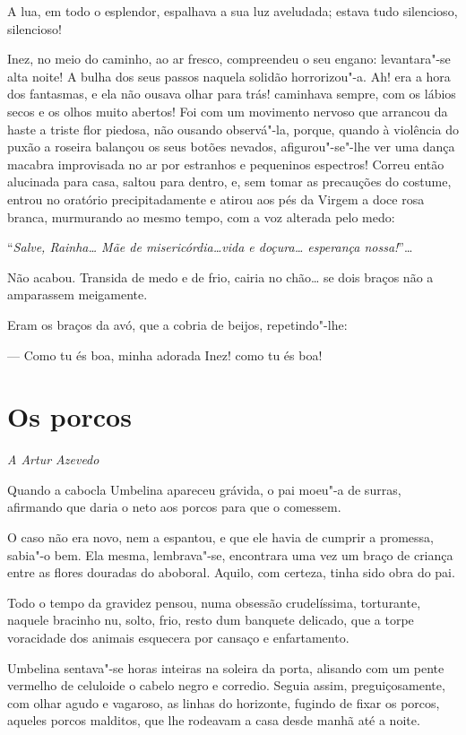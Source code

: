 A lua, em todo o esplendor, espalhava a sua luz aveludada; estava tudo
silencioso, silencioso!

Inez, no meio do caminho, ao ar fresco, compreendeu o seu engano:
levantara"-se alta noite! A bulha dos seus passos naquela solidão
horrorizou"-a. Ah! era a hora dos fantasmas, e ela não ousava olhar para
trás! caminhava sempre, com os lábios secos e os olhos muito abertos!
Foi com um movimento nervoso que arrancou da haste a triste flor
piedosa, não ousando observá"-la, porque, quando à violência do puxão a
roseira balançou os seus botões nevados, afigurou"-se"-lhe ver uma dança
macabra improvisada no ar por estranhos e pequeninos espectros! Correu
então alucinada para casa, saltou para dentro, e, sem tomar as
precauções do costume, entrou no oratório precipitadamente e atirou aos
pés da Virgem a doce rosa branca, murmurando ao mesmo tempo, com a voz
alterada pelo medo:

``\emph{Salve, Rainha\ldots{} Mãe de misericórdia\ldots{}vida e doçura\ldots{}
esperança nossa!}''\ldots{}

Não acabou. Transida de medo e de frio, cairia no chão\ldots{} se dois braços
não a amparassem meigamente.

Eram os braços da avó, que a cobria de beijos, repetindo"-lhe:

--- Como tu és boa, minha adorada Inez! como tu és boa!

\chapter{Os porcos}

\hfill{}\emph{A Artur Azevedo}

\bigskip

\noindent{}Quando a cabocla Umbelina apareceu grávida, o pai moeu"-a de surras,
afirmando que daria o neto aos porcos para que o comessem.

O caso não era novo, nem a espantou, e que ele havia de cumprir a
promessa, sabia"-o bem. Ela mesma, lembrava"-se, encontrara uma vez um
braço de criança entre as flores douradas do aboboral. Aquilo, com
certeza, tinha sido obra do pai.

Todo o tempo da gravidez pensou, numa obsessão crudelíssima, torturante,
naquele bracinho nu, solto, frio, resto dum banquete delicado, que a
torpe voracidade dos animais esquecera por cansaço e enfartamento.

Umbelina sentava"-se horas inteiras na soleira da porta, alisando com um
pente vermelho de celuloide o cabelo negro e corredio. Seguia assim,
preguiçosamente, com olhar agudo e vagaroso, as linhas do horizonte,
fugindo de fixar os porcos, aqueles porcos malditos, que lhe rodeavam a
casa desde manhã até a noite.

